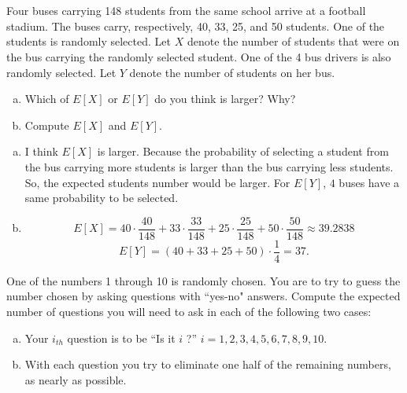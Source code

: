 \documentclass[14pt]{elegantbook}
\begin{document}

\setcounter{chapter}{2}
\chapter{}

    \begin{exercise*}[1]
        Four buses carrying 148 students from the same school arrive at a football stadium. The buses carry, respectively, 40, 33, 25, and 50 students. One of the students is randomly selected. Let $X$ denote the number of students that were on the bus carrying the randomly selected student. One of the 4 bus drivers is also randomly selected. Let $Y$ denote the number of students on her bus. 
        \begin{enumerate}[(a)]
            \item Which of $E[X]$ or $E[Y]$ do you think is larger? Why? 
            \item Compute $E[X]$ and $E[Y]$. 
        \end{enumerate}
    \end{exercise*}

    \begin{solution}
        \begin{enumerate}[(a)]
            \item I think $E[X]$ is larger. Because the probability of selecting a student from the bus carrying more students is larger than the bus carrying less students. So, the expected students number would be larger. For $E[Y]$, $4$ buses have a same probability to be selected. 
            \item \[E[X]=40\cdot\frac{40}{148}+33\cdot\frac{33}{148}+25\cdot\frac{25}{148}+50\cdot\frac{50}{148}\approx39.2838\]
            \[E[Y]=(40+33+25+50)\cdot\frac{1}{4}=37. \]
        \end{enumerate}
    \end{solution}

    \begin{exercise*}[2]
        One of the numbers 1 through 10 is randomly chosen. You are to try to guess the number chosen by asking questions with ``yes-no" answers. Compute the expected number of questions you will need to ask in each of the following two cases: 
        \begin{enumerate}[(a)]
            \item Your $i_{th}$ question is to be ``Is it $i$ ?'' $i = 1, 2, 3, 4, 5, 6, 7, 8, 9, 10$. 
            \item With each question you try to eliminate one half of the remaining numbers, as nearly 
            as possible. 
        \end{enumerate}
    \end{exercise*}
\end{document}
